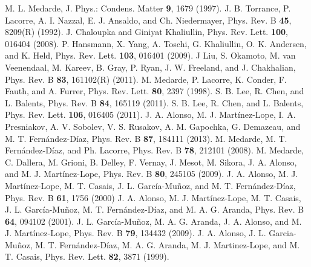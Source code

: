 \documentclass[showpacs,preprintnumbers,amsmath,amssymb,prl,aps,twocolumn,superscriptaddress]{revtex4}
\begin{document}
\begin{thebibliography}{99}
M. L. Medarde, J. Phys.: Condens. Matter {\bf 9}, 1679 (1997).
J. B. Torrance, P. Lacorre, A. I. Nazzal, E. J. Ansaldo, 
and Ch. Niedermayer, Phys. Rev. B {\bf 45}, 8209(R) (1992). 
J. Chaloupka and Giniyat Khaliullin, Phys. Rev. Lett. {\bf 100}, 016404 (2008).  
P. Hansmann, X. Yang, A. Toschi, G. Khaliullin, O. K. Andersen, and K. Held, 
Phys. Rev. Lett. {\bf 103}, 016401 (2009). 
J Liu, S. Okamoto, M. van Veenendaal, M. Kareev, B. Gray, P. Ryan, 
J. W. Freeland, and J. Chakhalian, Phys. Rev. B {\bf 83}, 161102(R) (2011).      
M. Medarde, P. Lacorre, K. Conder, F. Fauth, and A. Furrer, 
Phys. Rev. Lett. {\bf 80}, 2397 (1998). 
S. B. Lee, R. Chen, and L. Balents, Phys. Rev. B {\bf 84}, 165119 (2011). 
S. B. Lee, R. Chen, and L. Balents, Phys. Rev. Lett. {\bf 106}, 016405 (2011). 
J. A. Alonso, M. J. Mart{\'i}nez-Lope, I. A. Presniakov, A. V. Sobolev, V. S. Rusakov, 
A. M. Gapochka, G. Demazeau, and  M. T. Fern{\'a}ndez-D{\'i}az, Phys. Rev. B {\bf 87}, 184111 (2013).   
M. Medarde, M. T. Fern{\'a}ndez-D{\'i}az, and Ph. Lacorre, Phys. Rev. B {\bf 78}, 212101 (2008). 
M. Medarde, C. Dallera, M. Grioni, B. Delley, F. Vernay, J. Mesot, M. Sikora, 
J. A. Alonso, and M. J. Mart{\'i}nez-Lope, Phys. Rev. B {\bf 80}, 245105 (2009).  
J. A. Alonso, M. J. Mart{\'i}nez-Lope, M. T. Casais, J. L. Garc{\'i}a-Mu{\~n}oz, 
and M. T. Fern{\'a}ndez-D{\'i}az, Phys. Rev. B {\bf 61}, 1756 (2000)
J. A. Alonso, M. J. Mart{\'i}nez-Lope, M. T. Casais, J. L. Garc{\'i}a-Mu{\~n}oz, 
M. T. Fern{\'a}ndez-D{\'i}az, and M. A. G. Aranda, Phys. Rev. B {\bf 64}, 094102 (2001).
J. L. Garc{\'i}a-Mu{\~n}oz, M. A. G. Aranda, J. A. Alonso, and M. J. Mart{\'i}nez-Lope, 
Phys. Rev. B {\bf 79}, 134432 (2009). 
J. A. Alonso, J. L. Garcia-Mu{\~n}oz, M. T. Fern{\'a}ndez-D{\'i}az, 
M. A. G. Aranda, M. J. Martinez-Lope, and M. T. Casais, 
Phys. Rev. Lett. {\bf 82}, 3871 (1999). 



\end{thebibliography}
\end{document}
